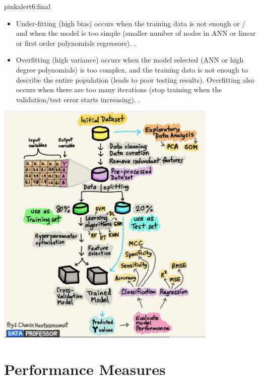 \documentclass{tron}
\begin{document}
\begin{note}{pink}{alert6:final}
	\begin{itemize}
		\item Under-fitting (high bias) occurs when the training data is not enough or / and when the model is too simple (smaller number of nodes in ANN or linear or first order polynomials regressors). .
		\item Overfitting (high variance) occurs when the model selected (ANN or high degree polynomials) is too complex, and the training data is not enough to describe the entire population (leads to poor testing results). Overfitting also occurs when there are too many iterations (stop training when the validation/test error starts increasing). .
	\end{itemize}	
	
	\includegraphics[width=400px]{Figs/Lec6/of-uf}
\end{note}


\newpage
\section{Performance Measures}
\end{document}
